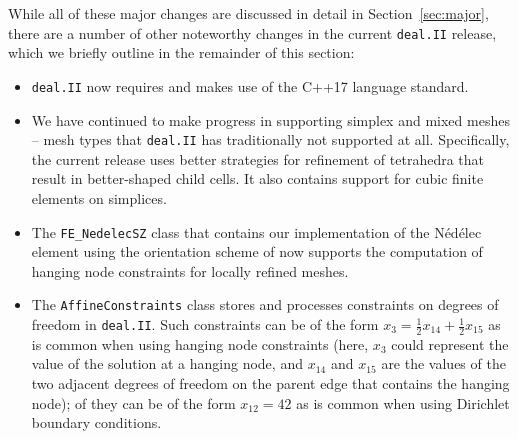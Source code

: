 \documentclass{ansarticle-preprint}
\newcommand{\specialword}[1]{\texttt{#1}}
\newcommand{\dealii}{{\specialword{deal.II}}\xspace}
\begin{document}
While all of these major changes are discussed in detail in
Section~\ref{sec:major}, there
are a number of other noteworthy changes in the current \dealii release,
which we briefly outline in the remainder of this section:
%
\begin{itemize}
  \item \dealii{} now requires and makes use of the C++17 language standard.
  \item We have continued to make progress in supporting simplex and
    mixed meshes -- mesh types that \dealii{} has traditionally not
    supported at all. Specifically, the current release uses
    better strategies for refinement of tetrahedra that result in
    better-shaped child cells. It also contains
    support for cubic finite elements on simplices.
  \item The \texttt{FE\_NedelecSZ} class that contains our
    implementation of the N\'ed\'elec element using the orientation
    scheme of \cite{Zag06} now supports the computation of hanging
    node constraints for locally refined meshes.
  \item The \texttt{AffineConstraints} class stores and processes
    constraints on degrees of freedom in \dealii{}. Such constraints
    can be of the form $x_3 = \frac 12 x_{14} + \frac 12 x_{15}$ as is
    common when using hanging node constraints (here, $x_3$ could
    represent the value of the solution at a hanging node, and $x_{14}$
    and $x_{15}$ are the values of the two adjacent degrees of freedom on
    the parent edge that contains the hanging node); of they can be of
    the form $x_{12}=42$ as is common when using Dirichlet boundary
    conditions.


\end{itemize}
\end{document}
